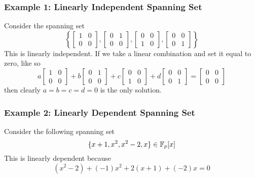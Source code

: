 \documentclass[letterpaper]{article}
\begin{document}
\subsubsection{Example 1: Linearly Independent Spanning Set}
Consider the spanning set 
\[\left\{\begin{bmatrix}
    1 & 0 \\ 0 & 0 
\end{bmatrix}, \begin{bmatrix}
    0 & 1 \\ 0 & 0 
\end{bmatrix}, \begin{bmatrix}
    0 & 0 \\ 1 & 0
\end{bmatrix}, \begin{bmatrix}
    0 & 0 \\ 0 & 1
\end{bmatrix}\right\}\]
This is linearly independent. If we take a linear combination and set it equal to zero, like so 
\[a\begin{bmatrix}
    1 & 0 \\ 0 & 0 
\end{bmatrix} + b\begin{bmatrix}
    0 & 1 \\ 0 & 0 
\end{bmatrix} + c\begin{bmatrix}
    0 & 0 \\ 1 & 0
\end{bmatrix} + d\begin{bmatrix}
    0 & 0 \\ 0 & 1
\end{bmatrix} = \begin{bmatrix}
    0 & 0 \\ 0 & 0
\end{bmatrix}\]
then clearly $a = b = c = d = 0$ is the only solution. 


\subsubsection{Example 2: Linearly Dependent Spanning Set}
Consider the following spanning set 
\[\{x + 1, x^2, x^2 - 2, x\} \in \mathbb{F}_{p}[x]\]
This is linearly dependent because
\[(x^2 - 2) + (-1)x^2 + 2(x + 1) + (-2)x = 0\]
\end{document}

